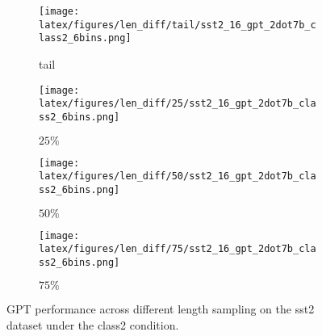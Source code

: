 \begin{figure*}
    \centering
    \begin{minipage}[t]{\linewidth}
        \begin{subfigure}{0.245\linewidth}
            \centering
            \texttt{[image: latex/figures/len\_diff/tail/sst2\_16\_gpt\_2dot7b\_class2\_6bins.png]}
            \caption{tail}\label{fig:image1}
        \end{subfigure}%
        \hfill
        \begin{subfigure}{0.245\linewidth}
            \centering
            \texttt{[image: latex/figures/len\_diff/25/sst2\_16\_gpt\_2dot7b\_class2\_6bins.png]}
            \caption{$25\%$}\label{fig:image2}
        \end{subfigure}
        \hfill
        \begin{subfigure}{0.245\linewidth}
            \centering
            \texttt{[image: latex/figures/len\_diff/50/sst2\_16\_gpt\_2dot7b\_class2\_6bins.png]}
            \caption{$50\%$}\label{fig:image3}
        \end{subfigure}
        \begin{subfigure}{0.245\linewidth}
            \centering
            \texttt{[image: latex/figures/len\_diff/75/sst2\_16\_gpt\_2dot7b\_class2\_6bins.png]}
            \caption{$75\%$}\label{fig:image4}
        \end{subfigure}%
    \end{minipage}%
    \hfill
    \begin{minipage}[c]{\linewidth}
        \caption{\label{fig:gpt-len-qnli}GPT performance across different length sampling on the sst2 dataset under the class2 condition.}
    \end{minipage}
\end{figure*}